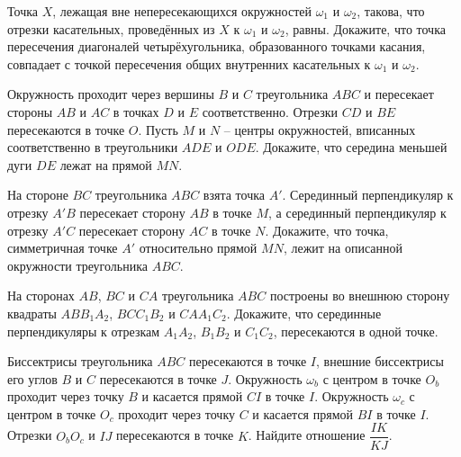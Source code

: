 \documentclass{article}
\begin{document}
\begin{enumerate_boxed}
        \item Точка $X$, лежащая вне непересекающихся окружностей $\omega_1$ и $\omega_2$, такова, что отрезки касательных, проведённых из $X$ к $\omega_1$ и $\omega_2$, равны.
        Докажите, что точка пересечения диагоналей четырёхугольника, образованного точками касания, совпадает с точкой пересечения общих внутренних касательных к $\omega_1$ и $\omega_2$.

        \item Окружность проходит через вершины $B$ и $C$ треугольника $ABC$ и пересекает стороны $AB$ и $AC$ в точках $D$ и $E$ соответственно.
        Отрезки $CD$ и $BE$ пересекаются в точке $O$.
        Пусть $M$ и $N$ – центры окружностей, вписанных соответственно в треугольники $ADE$ и $ODE$.
        Докажите, что середина меньшей дуги $DE$ лежат на прямой $MN$.

        \item На стороне $BC$ треугольника $ABC$ взята точка $A'$.
        Серединный перпендикуляр к отрезку $A'B$ пересекает сторону $AB$ в точке $M$, а серединный перпендикуляр к отрезку $A'C$ пересекает сторону $AC$ в точке $N$.
        Докажите, что точка, симметричная точке $A'$ относительно прямой $MN$, лежит на описанной окружности треугольника $ABC$.

        \item На сторонах $AB$, $BC$ и $CA$ треугольника $ABC$ построены во внешнюю сторону квадраты $ABB_{1}A_2$, $BCC_{1}B_2$ и $CAA_{1}C_2$.
        Докажите, что серединные перпендикуляры к отрезкам $A_{1}A_2$, $B_{1}B_2$ и $C_{1}C_2$, пересекаются в одной точке.

        \item Биссектрисы треугольника $ABC$ пересекаются в точке $I$, внешние биссектрисы его углов $B$ и $C$ пересекаются в точке $J$.
        Окружность $\omega_b$ с центром в точке $O_b$ проходит через точку $B$ и касается прямой $CI$ в точке $I$.
        Окружность $\omega_c$ с центром в точке $O_c$ проходит через точку $C$ и касается прямой $BI$ в точке $I$.
        Отрезки $O_{b}O_c$ и $IJ$ пересекаются в точке $K$.
        Найдите отношение $\dfrac{IK}{KJ}$.


    \end{enumerate_boxed}
\end{document}
